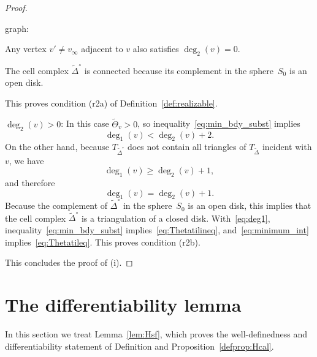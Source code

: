 \documentclass[a4paper, 11pt]{article}
\newcommand{\Deltil}{\widetilde{\Delta}}
\newcommand{\Deltilo}{\Deltil^{\circ}}
\newcommand{\Thetatil}{\widetilde{\Theta}}
\theoremstyle{plain}
\theoremstyle{definition}
\begin{document}
\begin{proof}
\begin{compactenum}[(a)]
    graph:
    \begin{compactenum}[(1)]
    \item Any vertex $v'\not=v_{\infty}$ adjacent to $v$ also
      satisfies $\deg_{2}(v)=0$.
    \item The cell complex $\Deltilo$ is connected because its complement
      in the sphere~$S_{0}$ is an open disk.
    \end{compactenum}
    This proves condition (r2a) of Definition~\ref{def:realizable}.
  \item $\deg_{2}(v)>0$: In this case $\Thetatil_{v}>0$, so
    inequality~\eqref{eq:min_bdy_subst} implies
    \begin{equation*}
      \deg_{1}(v)<\deg_{2}(v)+2.
    \end{equation*}
    On the other hand, because $T_{\Deltilo}$ does not contain all
    triangles of $T_{\Deltil}$ incident with $v$, we have
    \begin{equation*}
      \deg_{1}(v)\geq\deg_{2}(v)+1,
    \end{equation*}
    and therefore
    \begin{equation}
      \label{eq:deg1}
      \deg_{1}(v)=\deg_{2}(v)+1.
    \end{equation}
    Because the complement of $\Deltilo$ in the sphere~$S_{0}$ is an
    open disk, this implies that the cell complex $\Deltilo$ is a
    triangulation of a closed disk. With~\eqref{eq:deg1},
    inequality~\eqref{eq:min_bdy_subst}
    implies~\eqref{eq:Thetatilineq}, and~\eqref{eq:minimum_int}
    implies~\eqref{eq:Thetatileq}.  This proves condition (r2b).
  \end{compactenum}
  This concludes the proof of (i).
\end{proof}

\section{The differentiability lemma}
\label{sec:difflemma}

In this section we treat Lemma~\ref{lem:Hsf}, which proves the
well-definedness and differentiability statement of Definition and
Proposition~\ref{defprop:Hcal}.
\end{document}

